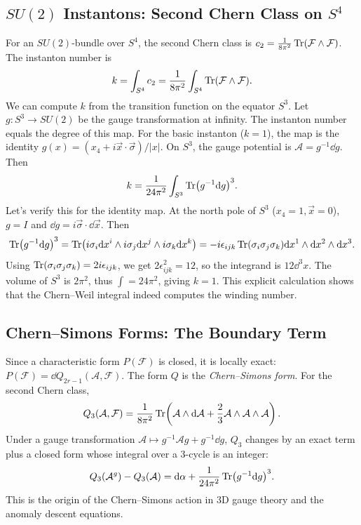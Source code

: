 \documentclass[11pt]{article}
\newcommand{\cA}{\mathcal{A}}
\newcommand{\cF}{\mathcal{F}}
\begin{document}
\subsection{\(SU(2)\) Instantons: Second Chern Class on \(S^4\)}
For an \(SU(2)\)-bundle over \(S^4\), the second Chern class is \(c_2 = \frac{1}{8\pi^2}\Tr(\cF\wedge\cF)\). The instanton number is
\[
k = \int_{S^4} c_2 = \frac{1}{8\pi^2} \int_{S^4} \Tr(\cF\wedge\cF).
\]
We can compute \(k\) from the transition function on the equator \(S^3\). Let \(g: S^3 \to SU(2)\) be the gauge transformation at infinity. The instanton number equals the degree of this map. For the basic instanton (\(k=1\)), the map is the identity \(g(x) = (x_4 + i\vec{x}\cdot\vec{\sigma})/|x|\). On \(S^3\), the gauge potential is \(\cA = g^{-1}\dd g\). Then
\[
k = \frac{1}{24\pi^2} \int_{S^3} \Tr(g^{-1}\dd g)^3.
\]
Let's verify this for the identity map. At the north pole of \(S^3\) (\(x_4=1, \vec{x}=0\)), \(g=I\) and \(\dd g = i\vec{\sigma}\cdot\dd\vec{x}\). Then
\[
\Tr(g^{-1}\dd g)^3 = \Tr(i\sigma_i \dd x^i \wedge i\sigma_j \dd x^j \wedge i\sigma_k \dd x^k) = -i \epsilon_{ijk} \Tr(\sigma_i\sigma_j\sigma_k) \dd x^1\wedge\dd x^2\wedge\dd x^3.
\]
Using \(\Tr(\sigma_i\sigma_j\sigma_k) = 2i\epsilon_{ijk}\), we get \(2\epsilon_{ijk}^2 = 12\), so the integrand is \(12 \dd^3x\). The volume of \(S^3\) is \(2\pi^2\), thus \(\int = 24\pi^2\), giving \(k=1\). This explicit calculation shows that the Chern--Weil integral indeed computes the winding number.

\subsection{Chern--Simons Forms: The Boundary Term}
Since a characteristic form \(P(\cF)\) is closed, it is locally exact: \(P(\cF) = \dd Q_{2r-1}(\cA,\cF)\). The form \(Q\) is the \emph{Chern--Simons form}. For the second Chern class,
\[
Q_3(\cA,\cF) = \frac{1}{8\pi^2} \Tr\!\left(\cA\wedge\dd\cA + \frac{2}{3}\cA\wedge\cA\wedge\cA\right).
\]
Under a gauge transformation \(\cA \mapsto g^{-1}\cA g + g^{-1}\dd g\), \(Q_3\) changes by an exact term plus a closed form whose integral over a 3-cycle is an integer:
\[
Q_3(\cA^g) - Q_3(\cA) = \dd\alpha + \frac{1}{24\pi^2}\Tr(g^{-1}\dd g)^3.
\]
This is the origin of the Chern--Simons action in 3D gauge theory and the anomaly descent equations.
\end{document}
